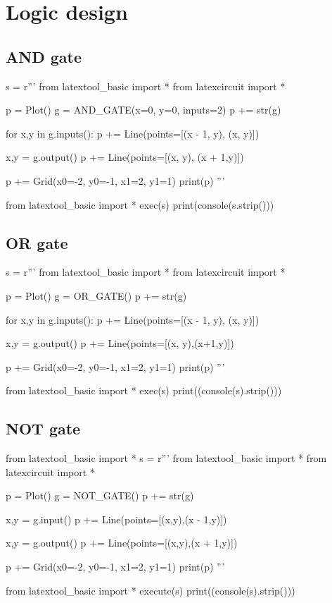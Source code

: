 \newpage
\section{Logic design}

\subsection{AND gate}
\begin{python}
s = r'''
from latextool_basic import *
from latexcircuit import *

p = Plot()
g = AND_GATE(x=0, y=0, inputs=2)
p += str(g)

for x,y in g.inputs():
    p += Line(points=[(x - 1, y), (x, y)])

x,y = g.output()
p += Line(points=[(x, y), (x + 1,y)])

p += Grid(x0=-2, y0=-1, x1=2, y1=1)
print(p)
'''

from latextool_basic import *
exec(s)
print(console(s.strip()))
\end{python}





\newpage
\subsection{OR gate}
\begin{python}
s = r'''
from latextool_basic import *
from latexcircuit import *

p = Plot()
g = OR_GATE()
p += str(g)

for x,y in g.inputs():
    p += Line(points=[(x - 1, y), (x, y)])

x,y = g.output()
p += Line(points=[(x, y),(x+1,y)])

p += Grid(x0=-2, y0=-1, x1=2, y1=1)
print(p)
'''

from latextool_basic import *
exec(s)
print((console(s).strip()))
\end{python}


\newpage
\subsection{NOT gate}
\begin{python}
from latextool_basic import *
s = r'''
from latextool_basic import *
from latexcircuit import *

p = Plot()
g = NOT_GATE()
p += str(g)

x,y = g.input()
p += Line(points=[(x,y),(x - 1,y)])

x,y = g.output()
p += Line(points=[(x,y),(x + 1,y)])

p += Grid(x0=-2, y0=-1, x1=2, y1=1)
print(p)
'''

from latextool_basic import *
execute(s)
print((console(s).strip()))
\end{python}






